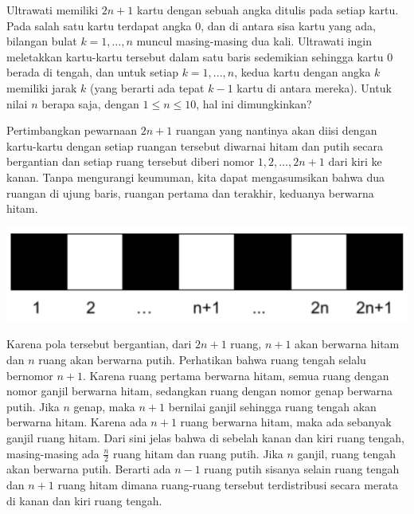 \documentclass[11pt]{scrartcl}
\begin{document}
\begin{soaljawab}
    Ultrawati memiliki $2n + 1$ kartu dengan sebuah angka ditulis pada setiap kartu. Pada salah satu kartu terdapat angka 0, dan di antara sisa kartu yang ada, bilangan bulat $k = 1, \dots, n$ muncul masing-masing dua kali. Ultrawati ingin meletakkan kartu-kartu tersebut dalam satu baris sedemikian sehingga kartu 0 berada di tengah, dan untuk setiap $k = 1, ..., n$, kedua kartu dengan angka $k$ memiliki jarak $k$ (yang berarti ada tepat $k - 1$ kartu di antara mereka). Untuk nilai $n$ berapa saja, dengan $1 \le n \le 10$, hal ini dimungkinkan?

    \begin{solusi}
        Pertimbangkan pewarnaan $2n+1$ ruangan yang nantinya akan diisi dengan kartu-kartu dengan setiap ruangan tersebut diwarnai hitam dan putih secara bergantian dan setiap ruang tersebut diberi nomor $1,2,\dots,2n+1$ dari kiri ke kanan. Tanpa mengurangi keumuman, kita dapat mengasumsikan bahwa dua ruangan di ujung baris, ruangan pertama dan terakhir, keduanya berwarna hitam. 
        \begin{center}
            \includegraphics[scale=0.3]{nordic}
        \end{center}
        Karena pola tersebut bergantian, dari $2n+1$ ruang, $n+1$ akan berwarna hitam dan $n$ ruang akan berwarna putih. 
        \vspace{10pt}
        Perhatikan bahwa ruang tengah selalu bernomor $n+1$. Karena ruang pertama berwarna hitam, semua ruang dengan nomor ganjil berwarna hitam, sedangkan ruang dengan nomor genap berwarna putih. 
        \vspace{10pt}
        Jika $n$ genap, maka $n+1$ bernilai ganjil sehingga ruang tengah akan berwarna hitam. Karena ada $n+1$ ruang berwarna hitam, maka ada sebanyak ganjil ruang hitam. Dari sini jelas bahwa di sebelah kanan dan kiri ruang tengah, masing-masing ada $\frac{n}{2}$ ruang hitam dan ruang putih.
        \vspace{10pt}
        Jika $n$ ganjil, ruang tengah akan berwarna putih. Berarti ada $n-1$ ruang putih sisanya selain ruang tengah dan $n+1$ ruang hitam dimana ruang-ruang tersebut terdistribusi secara merata di kanan dan kiri ruang tengah.

\end{solusi}
\end{soaljawab}
\end{document}
